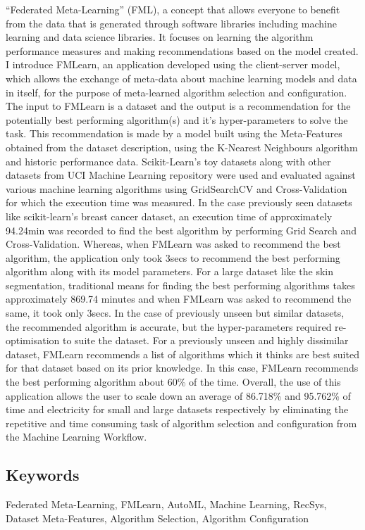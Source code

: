 \quad\quad “Federated Meta-Learning” (FML), a concept that allows everyone to benefit from the data that is generated through software libraries including machine learning and data science libraries. It focuses on learning the algorithm performance measures and making recommendations based on the model created. I introduce FMLearn, an application developed using the client-server model, which allows the exchange of meta-data about machine learning models and data in itself, for the purpose of meta-learned algorithm selection and configuration. 
The input to FMLearn is a dataset and the output is a recommendation for the potentially best performing algorithm(s) and it’s hyper-parameters to solve the task. This recommendation is made by a model built using the Meta-Features obtained from the dataset description, using the K-Nearest Neighbours algorithm and historic performance data.
Scikit-Learn’s toy datasets along with other datasets from UCI Machine Learning repository were used and evaluated against various machine learning algorithms using GridSearchCV and Cross-Validation for which the execution time was measured.
In the case previously seen datasets like scikit-learn’s breast cancer dataset, an execution time of approximately 94.24min was recorded to find the best algorithm by performing Grid Search and Cross-Validation. Whereas, when FMLearn was asked to recommend the best algorithm, the application only took 3secs to recommend the best performing algorithm along with its model parameters.
For a large dataset like the skin segmentation, traditional means for finding the best performing algorithms takes approximately 869.74 minutes and when FMLearn was asked to recommend the same, it took only 3secs.
In the case of previously unseen but similar datasets, the recommended algorithm is accurate, but the hyper-parameters required re-optimisation to suite the dataset. For a previously unseen and highly dissimilar dataset, FMLearn recommends a list of algorithms which it thinks are best suited for that dataset based on its prior knowledge. In this case, FMLearn recommends the best performing algorithm about 60\% of the time.
Overall, the use of this application allows the user to scale down an average of 86.718\% and 95.762\% of time and electricity for small and large datasets respectively by eliminating the repetitive and time consuming task of algorithm selection and configuration from the Machine Learning Workflow. 

\subsection*{Keywords}
{Federated Meta-Learning, FMLearn, AutoML, Machine Learning, RecSys, Dataset Meta-Features, Algorithm Selection, Algorithm Configuration}


